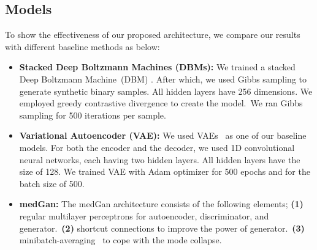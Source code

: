 \documentclass[letterpaper]{article} \usepackage{aaai20}  \usepackage{times}  \usepackage{helvet} \usepackage{courier}  \usepackage[hyphens]{url}  \usepackage{graphicx} \urlstyle{rm} \def\UrlFont{\rm}  \usepackage{graphicx}  \frenchspacing  \setlength{\pdfpagewidth}{8.5in}  \setlength{\pdfpageheight}{11in}
\begin{document}
\begin{table}[t]
\caption{Statistics of the UCI Epileptic Seizure Recognition dataset.}
\centering
{}
\label{tab:uci_stats}
\end{table}

\subsection{Models}\label{sec:Experimentssub:Models}

To show the effectiveness of our proposed architecture, we compare our results with different baseline methods as below:

\begin{itemize}
\item \textbf{Stacked Deep Boltzmann Machines (DBMs):} We trained a stacked Deep Boltzmann Machine~(DBM) \cite{hinton2009replicated}. After which, we used Gibbs sampling to generate synthetic binary samples. All hidden layers have 256 dimensions. We employed greedy contrastive divergence to create the model.~We ran Gibbs sampling for 500 iterations per sample.

\item \textbf{Variational Autoencoder (VAE):} We used VAEs~\cite{kingma2013auto} as one of our baseline models.
For both the encoder and the decoder, we used 1D convolutional neural networks, each having two hidden layers.
All hidden layers have the size of 128.
We trained VAE with Adam optimizer for 500 epochs and for the batch size of 500.

\item \textbf{medGan:} The medGan \cite{choi2017generating} architecture consists of the following elements; 
\textbf{(1)} regular multilayer perceptrons for autoencoder, discriminator, and generator.~\textbf{(2)} shortcut connections to improve the power of generator.~\textbf{(3)} minibatch-averaging~\cite{choi2017generating} to cope with the mode collapse.

\end{itemize}
\end{document}
